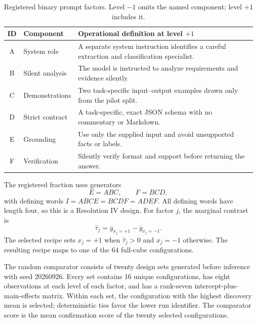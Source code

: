 \documentclass[11pt,a4paper]{article}
\begin{document}
\begin{table}[t]
\centering
\small
\caption{Registered binary prompt factors. Level $-1$ omits the named component; level $+1$ includes it.}
\label{tab:factors}
\begin{tabularx}{\textwidth}{clX}
\toprule
\textbf{ID} & \textbf{Component} & \textbf{Operational definition at level $+1$}\\
\midrule
A & System role & A separate system instruction identifies a careful extraction and classification specialist.\\
B & Silent analysis & The model is instructed to analyze requirements and evidence silently.\\
C & Demonstrations & Two task-specific input--output examples drawn only from the pilot split.\\
D & Strict contract & A task-specific, exact JSON schema with no commentary or Markdown.\\
E & Grounding & Use only the supplied input and avoid unsupported facts or labels.\\
F & Verification & Silently verify format and support before returning the answer.\\
\bottomrule
\end{tabularx}
\end{table}

The registered fraction uses generators
\begin{equation}
E=ABC,\qquad F=BCD,
\end{equation}
with defining words $I=ABCE=BCDF=ADEF$. All defining words have length four, so this is a Resolution IV design. For factor $j$, the marginal contrast is
\begin{equation}
\widehat{\tau}_j=\overline{y}_{x_j=+1}-\overline{y}_{x_j=-1}.
\end{equation}
The selected recipe sets $x_j=+1$ when $\widehat{\tau}_j>0$ and $x_j=-1$ otherwise. The resulting recipe maps to one of the 64 full-cube configurations.

The random comparator consists of twenty design sets generated before inference with seed 20260926. Every set contains 16 unique configurations, has eight observations at each level of each factor, and has a rank-seven intercept-plus-main-effects matrix. Within each set, the configuration with the highest discovery mean is selected; deterministic ties favor the lower run identifier. The comparator score is the mean confirmation score of the twenty selected configurations.

\end{document}
